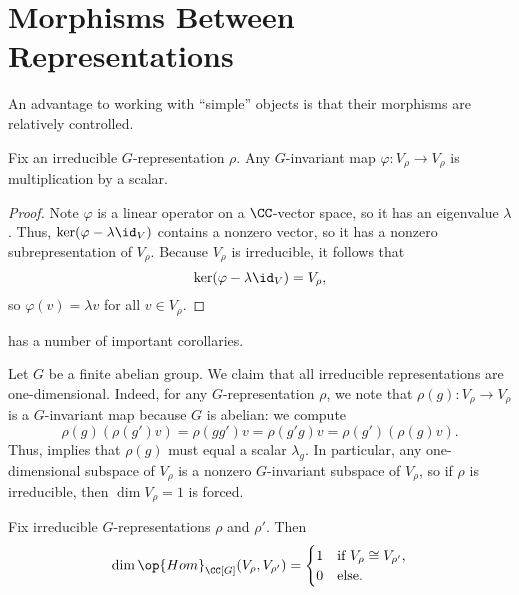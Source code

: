 \documentclass[../main.tex]{subfiles}
\begin{document}
\section{Morphisms Between Representations}
An advantage to working with ``simple'' objects is that their morphisms are relatively controlled.
\begin{theorem} \label{thm:schur}
	Fix an irreducible $G$-representation $\rho$. Any $G$-invariant map $\varphi\colon V_\rho\to V_\rho$ is multiplication by a scalar.
\end{theorem}
\begin{proof}
	Note $\varphi$ is a linear operator on a $\CC$-vector space, so it has an eigenvalue $\lambda$. Thus, $\ker(\varphi-\lambda{\id_V})$ contains a nonzero vector, so it has a nonzero subrepresentation of $V_\rho$. Because $V_\rho$ is irreducible, it follows that
	\[\ker(\varphi-\lambda{\id_V})=V_\rho,\]
	so $\varphi(v)=\lambda v$ for all $v\in V_\rho$.
\end{proof}
 has a number of important corollaries.
\begin{example}
	Let $G$ be a finite abelian group. We claim that all irreducible representations are one-dimensional. Indeed, for any $G$-representation $\rho$, we note that $\rho(g)\colon V_\rho\to V_\rho$ is a $G$-invariant map because $G$ is abelian: we compute
	\[\rho(g)(\rho(g')v)=\rho(gg')v=\rho(g'g)v=\rho(g')(\rho(g)v).\]
	Thus,  implies that $\rho(g)$ must equal a scalar $\lambda_g$. In particular, any one-dimensional subspace of $V_\rho$ is a nonzero $G$-invariant subspace of $V_\rho$, so if $\rho$ is irreducible, then $\dim V_\rho=1$ is forced.
\end{example}
\begin{corollary} \label{cor:irrep-morphisms}
	Fix irreducible $G$-representations $\rho$ and $\rho'$. Then
	\[\dim\op{Hom}_{\CC[G]}(V_\rho,V_{\rho'})=\begin{cases}
		1 & \text{if }V_\rho\cong V_{\rho'}, \\
		0 & \text{else}.
	\end{cases}\]
\end{corollary}
\end{document}
